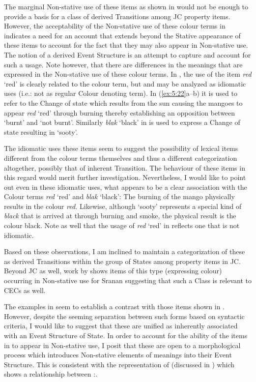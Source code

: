 The marginal Non-stative use of these items as shown in  would not be enough to provide a basis for a class of derived Transitions among JC property items. However, the acceptability of the Non-stative use of these colour terms in  indicates a need for an account that extends beyond the Stative appearance of these items to account for the fact that they may also appear in Non-stative use. The notion of a derived Event Structure is an attempt to capture and account for such a usage. Note however, that there are differences in the meanings that are expressed in the Non-stative use of these colour terms. In , the use of the item \textit{red} ‘red’ is clearly related to the colour term, but  and  may be analyzed as idiomatic uses (i.e.: not as regular Colour denoting term). In (\ref{ex:5:22}a--b) it is used to refer to the Change of state which results from the sun causing the mangoes to appear \textit{red} ‘red’ through burning thereby establishing an opposition between `burnt' and `not burnt'. Similarly \textit{blak} `black' in  is used to express a Change of state resulting in `sooty'. 

The idiomatic uses these items seem to suggest the possibility of lexical items different from the colour terms themselves and thus a different categorization altogether, possibly that of inherent Transition. The behaviour of these items in this regard would merit further investigation. Nevertheless, I would like to point out even in these idiomatic uses, what appears to be a clear association with the Colour terms \textit{red} `red' and \textit{blak} `black': The burning of the mango physically results in the colour \textit{red.} Likewise, although `sooty' represents a special kind of \textit{black} that is arrived at through burning and smoke, the physical result is the colour black. Note as well that the usage of \textit{red} `red' in  reflects one that is not idiomatic. 

Based on these observations, I am inclined to maintain a categorization of these as derived Transitions within the group of States among property items in JC. Beyond JC as well, work by \citet{Alleyne1987} shows items of this type (expressing colour) occurring in Non-stative use for Sranan suggesting that such a Class is relevant to CECs as well. 

The examples in  seem to establish a contrast with those items shown in . However, despite the seeming separation between such forms based on syntactic criteria, I would like to suggest that these are unified as inherently associated with an Event Structure of State. In order to account for the ability of the items in  to appear in Non-stative use, I posit that these are open to a morphological process which introduces Non-stative elements of meanings into their Event Structure. This is consistent with the representation of \citet{Carter1976} (discussed in ) which shows a relationship between \DARK:\DARKEN. 


